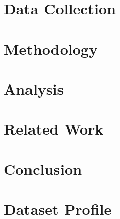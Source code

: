 \documentclass[10pt,twocolumn]{IEEEtran11}
\begin{document}
\section{Data Collection}
\label{sec:datacollection}


\section{Methodology}
\label{sec:methodology}


\section{Analysis}
\label{sec:analysis}


\section{Related Work}  
\label{sec:relatedwork}


\section{Conclusion}
\label{sec:conclusion}


\onecolumn
{}
\label{app:user-attributes}


\section{Dataset Profile}


\twocolumn

\end{document}
